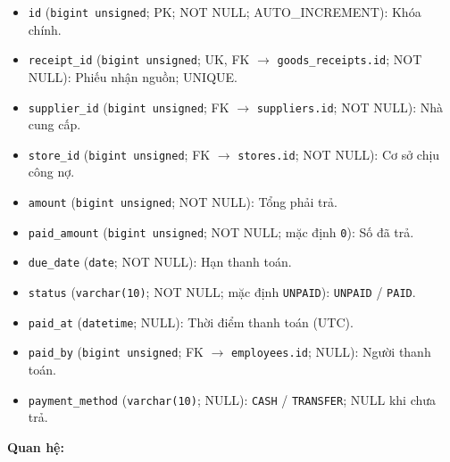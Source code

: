 \begin{itemize}

\item \texttt{id} (\texttt{bigint unsigned}; PK; NOT NULL; AUTO_INCREMENT): Khóa chính.

\item \texttt{receipt\_id} (\texttt{bigint unsigned}; UK, FK $\rightarrow$ \texttt{goods\_receipts.id}; NOT NULL): Phiếu nhận nguồn; UNIQUE.

\item \texttt{supplier\_id} (\texttt{bigint unsigned}; FK $\rightarrow$ \texttt{suppliers.id}; NOT NULL): Nhà cung cấp.

\item \texttt{store\_id} (\texttt{bigint unsigned}; FK $\rightarrow$ \texttt{stores.id}; NOT NULL): Cơ sở chịu công nợ.

\item \texttt{amount} (\texttt{bigint unsigned}; NOT NULL): Tổng phải trả.

\item \texttt{paid\_amount} (\texttt{bigint unsigned}; NOT NULL; mặc định \texttt{0}): Số đã trả.

\item \texttt{due\_date} (\texttt{date}; NOT NULL): Hạn thanh toán.

\item \texttt{status} (\texttt{varchar(10)}; NOT NULL; mặc định \texttt{UNPAID}): \texttt{UNPAID} / \texttt{PAID}.

\item \texttt{paid\_at} (\texttt{datetime}; NULL): Thời điểm thanh toán (UTC).

\item \texttt{paid\_by} (\texttt{bigint unsigned}; FK $\rightarrow$ \texttt{employees.id}; NULL): Người thanh toán.

\item \texttt{payment\_method} (\texttt{varchar(10)}; NULL): \texttt{CASH} / \texttt{TRANSFER}; NULL khi chưa trả.

\end{itemize}

\textbf{Quan hệ:}

